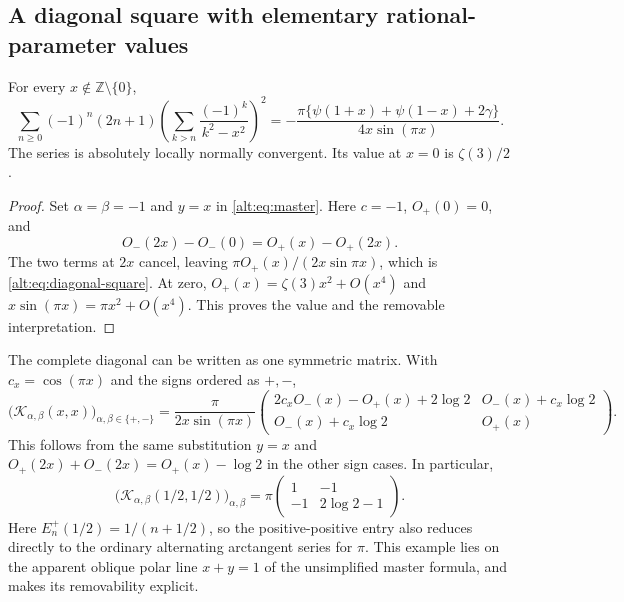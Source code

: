\subsection{A diagonal square with elementary rational-parameter values}

\begin{corollary}
\label{alt:cor:square}
For every $x\notin\mathbb Z\setminus\{0\}$,
\begin{equation}\label{alt:eq:diagonal-square}
 \boxed{\displaystyle
 \sum_{n\ge0}(-1)^n(2n+1)
       \left(\sum_{k>n}\frac{(-1)^k}{k^2-x^2}\right)^2
 =-\frac{\pi\{\psi(1+x)+\psi(1-x)+2\gamma\}}
             {4x\sin(\pi x)}.}
\end{equation}
The series is absolutely locally normally convergent. Its value at
$x=0$ is $\zeta(3)/2$.
\end{corollary}
\begin{proof}
Set $\alpha=\beta=-1$ and $y=x$ in
\eqref{alt:eq:master}. Here $c=-1$, $O_+(0)=0$, and
\[
 O_-(2x)-O_-(0)=O_+(x)-O_+(2x).
\]
The two terms at $2x$ cancel, leaving
$\pi O_+(x)/(2x\sin\pi x)$, which is
\eqref{alt:eq:diagonal-square}. At zero,
$O_+(x)=\zeta(3)x^2+O(x^4)$ and
$x\sin(\pi x)=\pi x^2+O(x^4)$. This proves the value and the
removable interpretation.
\end{proof}

The complete diagonal can be written as one symmetric matrix. With
$c_x=\cos(\pi x)$ and the signs ordered as $+,-$,
\begin{equation}\label{alt:eq:diagonal-matrix}
 \bigl(\mathcal K_{\alpha,\beta}(x,x)\bigr)_{\alpha,\beta\in\{+,-\}}
 =\frac{\pi}{2x\sin(\pi x)}
 \begin{pmatrix}
 2c_xO_-(x)-O_+(x)+2\log2 & O_-(x)+c_x\log2\\
 O_-(x)+c_x\log2 & O_+(x)
 \end{pmatrix}.
\end{equation}
This follows from the same substitution $y=x$ and
$O_+(2x)+O_-(2x)=O_+(x)-\log2$ in the other sign cases.
In particular,
\begin{equation}\label{alt:eq:half-matrix}
 \bigl(\mathcal K_{\alpha,\beta}(1/2,1/2)\bigr)_{\alpha,\beta}
 =\pi\begin{pmatrix}1&-1\\-1&2\log2-1\end{pmatrix}.
\end{equation}
Here $E_n^+(1/2)=1/(n+1/2)$, so the positive-positive entry also
reduces directly to the ordinary alternating arctangent series for
$\pi$. This example lies on the apparent oblique polar line $x+y=1$
of the unsimplified master formula, and makes its removability explicit.

